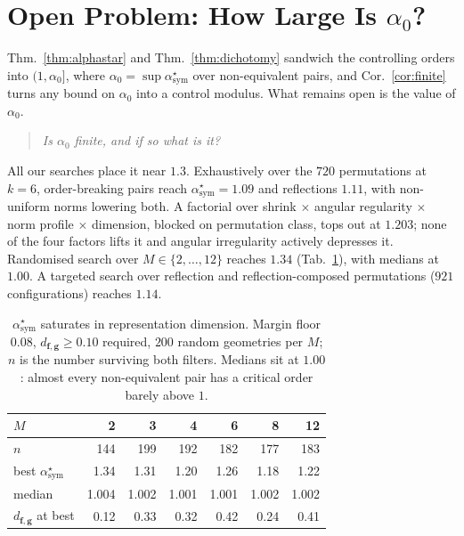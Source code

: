 \documentclass[10pt,letterpaper,twocolumn]{article}
\newcommand{\bff}{\mathbf{f}}
\newcommand{\bfg}{\mathbf{g}}
\newcommand{\dfg}{d_{\bff,\bfg}}
\theoremstyle{plain}
\theoremstyle{definition}
\theoremstyle{remark}
\begin{document}
\section{Open Problem: How Large Is $\alpha_{0}$?}
\label{sec:open}

Thm.~\ref{thm:alphastar} and Thm.~\ref{thm:dichotomy} sandwich the controlling
orders into $(1,\alpha_{0}]$, where
$\alpha_{0}=\sup\alpha^{\star}_{\mathrm{sym}}$ over non-equivalent pairs, and
Cor.~\ref{cor:finite} turns any bound on $\alpha_{0}$ into a control modulus.
What remains open is the value of $\alpha_{0}$.

\begin{quote}
\emph{Is $\alpha_{0}$ finite, and if so what is it?}
\end{quote}

All our searches place it near $1.3$. Exhaustively over the $720$ permutations
at $k=6$, order-breaking pairs reach $\alpha^{\star}_{\mathrm{sym}}=1.09$ and
reflections $1.11$, with non-uniform norms lowering both. A factorial over
shrink $\times$ angular regularity $\times$ norm profile $\times$ dimension,
blocked on permutation class, tops out at $1.203$; none of the four factors
lifts it and angular irregularity actively depresses it. Randomised search over
$M\in\{2,\dots,12\}$ reaches $1.34$ (Tab.~\ref{tab:mscale}), with medians at
$1.00$. A targeted search over reflection and reflection-composed permutations
($921$ configurations) reaches $1.14$.

\begin{table}[t]
\centering\small
\caption{$\alpha^{\star}_{\mathrm{sym}}$ saturates in representation dimension.
Margin floor $0.08$, $\dfg\ge0.10$ required, $200$ random geometries per $M$;
$n$ is the number surviving both filters. Medians sit at $1.00$: almost every
non-equivalent pair has a critical order barely above $1$.}
\label{tab:mscale}
\begin{tabular}{@{}lrrrrrr@{}}
\toprule
$M$ & 2 & 3 & 4 & 6 & 8 & 12 \\
\midrule
$n$                                  & 144 & 199 & 192 & 182 & 177 & 183 \\
best $\alpha^{\star}_{\mathrm{sym}}$ & 1.34 & 1.31 & 1.20 & 1.26 & 1.18 & 1.22 \\
median                               & 1.004 & 1.002 & 1.001 & 1.001 & 1.002 & 1.002 \\
$\dfg$ at best                       & 0.12 & 0.33 & 0.32 & 0.42 & 0.24 & 0.41 \\
\bottomrule
\end{tabular}
\end{table}
\end{document}
